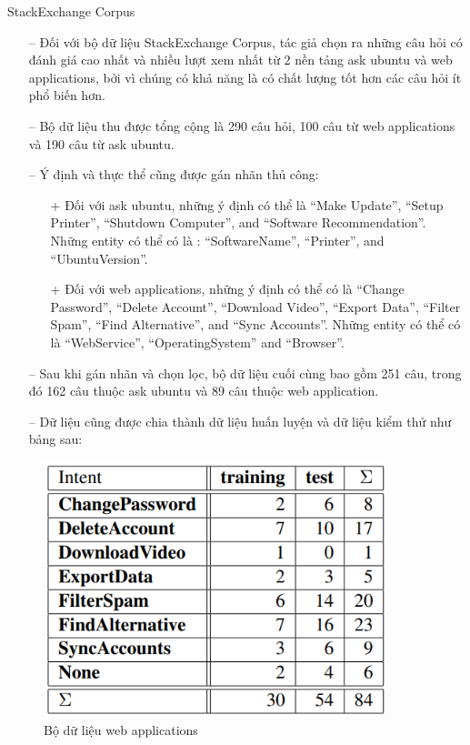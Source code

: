 StackExchange Corpus

\begin{itemize}
    \item[--] Đối với bộ dữ liệu StackExchange Corpus, tác giả chọn ra những câu hỏi có đánh giá cao nhất và nhiều lượt xem nhất từ 2 nền tảng ask ubuntu và web applications,  bởi vì chúng có khả năng là có chất lượng tốt hơn các câu hỏi ít phổ biến hơn.
        \item[--]Bộ dữ liệu thu được tổng cộng là 290 câu hỏi, 100 câu từ web applications và 190 câu từ ask ubuntu.
        \item[--]Ý định và thực thể cũng được gán nhãn thủ công:
        \begin{itemize}
            \item[+]Đối với ask ubuntu, những ý định có thể là “Make Update”, “Setup Printer”, “Shutdown Computer”, and “Software Recommendation”. Những entity có thể có là : “SoftwareName”, “Printer”, and “UbuntuVersion”.
            \item[+] Đối với web applications, những ý định có thể có là “Change Password”, “Delete Account”, “Download Video”, “Export Data”, “Filter Spam”, “Find Alternative”, and “Sync Accounts”. Những entity có thể có là “WebService”, “OperatingSystem” and “Browser”.
        \end{itemize}
    \item[--] Sau khi gán nhãn và chọn lọc, bộ dữ liệu cuối cùng bao gồm 251 câu, trong đó 162 câu thuộc ask ubuntu và 89 câu thuộc web application.
    \item[--] Dữ liệu cũng được chia thành dữ liệu huấn luyện và dữ liệu kiểm thử như bảng sau:
\end{itemize}

\begin{figure}[htp]
    \centering
    \includegraphics[width=10cm]{images/comparisonimg/webappdatasets.png}
    \caption{Bộ dữ liệu web applications}
    \label{fig:comparisonimg-webappdatasets}
\end{figure}

